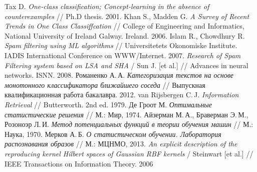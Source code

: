 \begin{thebibliography}{99}

 Tax D. \textit{One-class classification; Concept-learning in the absence of
counterexamples} // Ph.D thesis. 2001.
 Khan S., Madden G. \textit{A Survey of Recent Trends in One Class
Classiffcation} // College of Engineering and Informatics, National University of Ireland Galway.
Ireland. 2006.
 Islam R., Chowdhury R. \textit{Spam filtering using ML algorithms} // Universitetets Okonomiske Institute. IADIS International Conference on WWW/Internet. 2007.
 \textit{Research of Spam Filtering system based on LSA and SHA} / Sun J. [et al.] // Advances in neural networks. ISNN. 2008.
 Романенко А.\,А. \textit{Категоризация текстов на основе монотонного
классификатора ближайшего соседа} // Выпускная квалификационная работа бакалавра. 2012.
 van Rijsbergen C.\,J. \textit{Information Retrieval} // Butterworth. 2nd ed. 1979.
Де Гроот М. \textit{Оптимальные статистические решения} // М.: Мир, 1974.
 Айзерман М.\,А., Браверман Э.\,М., Розоноэр Л.\,И. \textit{Метод потенциальных функций в теории обучения машин} // М.: Наука, 1970.
 Мерков А.\,Б. \textit{О статистическом обучении. Лаборатория распознавания образов} // М.: МЦНМО, 2013.
  \textit{An explicit description of the reproducing kernel Hilbert spaces of Gaussian RBF kernels} / Steinwart [et al.] // IEEE Transactions on Information Theory. 2006
\end{thebibliography}
